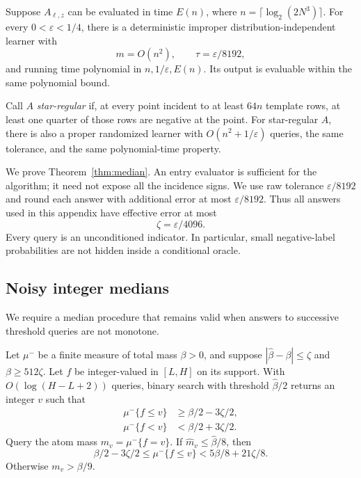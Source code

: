 \documentclass[11pt,letterpaper,pmlr,twoside]{jmlr}
\newcommand{\eps}{\varepsilon}
\newcommand{\ceil}[1]{\lceil #1\rceil}
\begin{document}
\begin{theorem}
\label{thm:median}
Suppose $A_{\ell,z}$ can be evaluated in time $E(n)$, where $n=\ceil{\log_2(2N^3)}$. For every $0<\eps<1/4$, there is a deterministic improper distribution-independent learner with
\begin{equation}
 m=O(n^2),\qquad \tau=\eps/8192,
\label{eq:medianparams}
\end{equation}
and running time polynomial in $n,1/\eps,E(n)$. Its output is evaluable within the same polynomial bound.

Call $A$ \emph{star-regular} if, at every point incident to at least $64n$ template rows, at least one quarter of those rows are negative at the point. For star-regular $A$, there is also a proper randomized learner with $O(n^2+1/\eps)$ queries, the same tolerance, and the same polynomial-time property.
\end{theorem}

We prove Theorem~\ref{thm:median}. An entry evaluator is sufficient for the algorithm; it need not expose all the incidence signs. We use raw tolerance $\eps/8192$ and round each answer with additional error at most $\eps/8192$. Thus all answers used in this appendix have effective error at most
\begin{equation}
 \zeta=\eps/4096.
\label{eq:zeta}
\end{equation}
Every query is an unconditioned indicator. In particular, small negative-label probabilities are not hidden inside a conditional oracle.

\subsection{Noisy integer medians}
We require a median procedure that remains valid when answers to successive threshold queries are not monotone.

\begin{lemma}
\label{lem:noisymedian}
Let $\mu^-$ be a finite measure of total mass $\beta>0$, and suppose $|\hat\beta-\beta|\le\zeta$ and $\beta\ge512\zeta$. Let $f$ be integer-valued in $[L,H]$ on its support. With $O(\log(H-L+2))$ queries, binary search with threshold $\hat\beta/2$ returns an integer $v$ such that
\begin{align}
 \mu^-\{f\le v\}&\ge\beta/2-3\zeta/2,\label{eq:medianlo}\\
 \mu^-\{f<v\}&<\beta/2+3\zeta/2.\label{eq:medianhi}
\end{align}
Query the atom mass $m_v=\mu^-\{f=v\}$. If $\hat m_v\le\hat\beta/8$, then
\begin{equation}
 \beta/2-3\zeta/2\le\mu^-\{f\le v\}
 <5\beta/8+21\zeta/8.
\label{eq:balancedprefix}
\end{equation}
Otherwise $m_v>\beta/9$.
\end{lemma}
\end{document}
